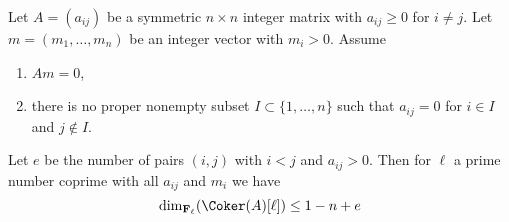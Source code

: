 \begin{lemma}
\label{lemma-recurring-symmetric-integer}
Let $A = (a_{ij})$ be a symmetric $n \times n$ integer matrix with
$a_{ij} \geq 0$ for $i \not = j$. Let $m = (m_1, \ldots, m_n)$ be an
integer vector with $m_i > 0$. Assume
\begin{enumerate}
\item $Am = 0$,
\item there is no proper nonempty subset $I \subset \{1, \ldots, n\}$
such that $a_{ij} = 0$ for $i \in I$ and $j \not \in I$.
\end{enumerate}
Let $e$ be the number of pairs $(i, j)$ with $i < j$ and $a_{ij} > 0$.
Then for $\ell$ a prime number coprime with all $a_{ij}$ and $m_i$
we have
$$
\dim_{\mathbf{F}_\ell}(\Coker(A)[\ell]) \leq 1 - n + e
$$
\end{lemma}

